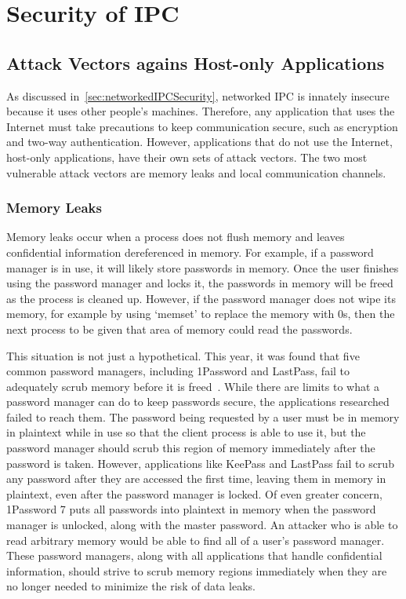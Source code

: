 \chapter{Security of IPC}
\label{sec:securityOfIPC}

\section{Attack Vectors agains Host-only Applications}
\label{sec:hostOnlyAttackVectors}
As discussed in~\ref{sec:networkedIPCSecurity}, networked IPC is innately insecure because it uses other people's machines.  Therefore, any application that uses the Internet must take precautions to keep communication secure, such as encryption and two-way authentication.  However, applications that do not use the Internet, host-only applications, have their own sets of attack vectors.  The two most vulnerable attack vectors are memory leaks and local communication channels.

\subsection{Memory Leaks}
\label{sec:memoryLeaks}
Memory leaks occur when a process does not flush memory and leaves confidential information dereferenced in memory.  For example, if a password manager is in use, it will likely store passwords in memory.  Once the user finishes using the password manager and locks it, the passwords in memory will be freed as the process is cleaned up.  However, if the password manager does not wipe its memory, for example by using `memset' to replace the memory with 0s, then the next process to be given that area of memory could read the passwords.

This situation is not just a hypothetical.  This year, it was found that five common password managers, including 1Password and LastPass, fail to adequately scrub memory before it is freed~\cite{independent_security_evaluators_2019}.  While there are limits to what a password manager can do to keep passwords secure, the applications researched failed to reach them.  The password being requested by a user must be in memory in plaintext while in use so that the client process is able to use it, but the password manager should scrub this region of memory immediately after the password is taken.  However, applications like KeePass and LastPass fail to scrub any password after they are accessed the first time, leaving them in memory in plaintext, even after the password manager is locked.  Of even greater concern, 1Password 7 puts all passwords into plaintext in memory when the password manager is unlocked, along with the master password.  An attacker who is able to read arbitrary memory would be able to find all of a user's password manager.  These password managers, along with all applications that handle confidential information, should strive to scrub memory regions immediately when they are no longer needed to minimize the risk of data leaks.

